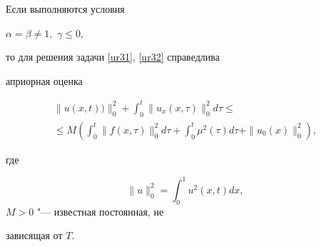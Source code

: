 \begin{theorem}[3]Если выполняются условия

$

\alpha=\beta\neq1,$ $\gamma \leq 0,

$

то для решения задачи \eqref{ur31}{\rm ,} \eqref{ur32} справедлива

априорная оценка

\begin{multline}

\|u(x,t))\|_0^2+\int_{0}^{t}\|u_x(x,\tau)\|_0^2d\tau\leq

\\

\leq M\left(\int_{0}^{t}\|f(x,\tau)\|_0^2d\tau+\int_{0}^{t}\mu^2(\tau)d\tau+\|u_0(x)\|_0^2\right),

 \label{ur33}

\end{multline}

 где

$$\|u\|_0^2=\int_0^1u^2(x,t)dx,$$ $M>0$ "--- известная постоянная, не

зависящая от $T.$

\end{theorem}



\smallskip



